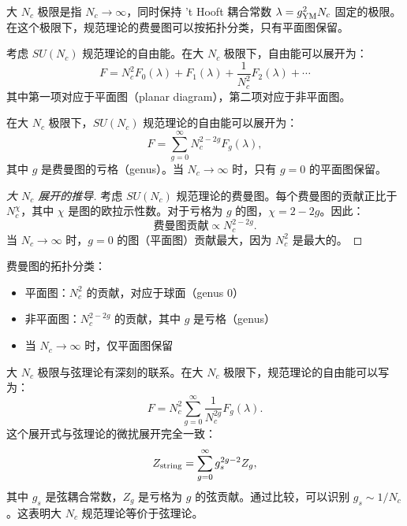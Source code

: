 \begin{definition}[大 $N_c$ 极限]
大 $N_c$ 极限是指 $N_c \to \infty$，同时保持 't Hooft 耦合常数 $\lambda = g_{\rm YM}^2 N_c$ 固定的极限。在这个极限下，规范理论的费曼图可以按拓扑分类，只有平面图保留。
\end{definition}

考虑 $SU(N_c)$ 规范理论的自由能。在大 $N_c$ 极限下，自由能可以展开为：
\begin{equation}
    F = N_c^2 F_0(\lambda) + F_1(\lambda) + \frac{1}{N_c^2} F_2(\lambda) + \cdots
\end{equation}
其中第一项对应于平面图（planar diagram），第二项对应于非平面图。

\begin{theorem}[大 $N_c$ 展开]
在大 $N_c$ 极限下，$SU(N_c)$ 规范理论的自由能可以展开为：
\begin{equation}
    F = \sum_{g=0}^{\infty} N_c^{2-2g} F_g(\lambda),
\end{equation}
其中 $g$ 是费曼图的亏格（genus）。当 $N_c \to \infty$ 时，只有 $g=0$ 的平面图保留。
\end{theorem}

\begin{proof}[大 $N_c$ 展开的推导]
考虑 $SU(N_c)$ 规范理论的费曼图。每个费曼图的贡献正比于 $N_c^{\chi}$，其中 $\chi$ 是图的欧拉示性数。对于亏格为 $g$ 的图，$\chi = 2 - 2g$。因此：
\begin{equation}
    \text{费曼图贡献} \propto N_c^{2-2g}.
\end{equation}
当 $N_c \to \infty$ 时，$g=0$ 的图（平面图）贡献最大，因为 $N_c^2$ 是最大的。
\end{proof}

费曼图的拓扑分类：
\begin{itemize}
    \item 平面图：$N_c^2$ 的贡献，对应于球面（genus 0）
    \item 非平面图：$N_c^{2-2g}$ 的贡献，其中 $g$ 是亏格（genus）
    \item 当 $N_c \to \infty$ 时，仅平面图保留
\end{itemize}

\begin{remark}[大 $N_c$ 极限与弦理论]
大 $N_c$ 极限与弦理论有深刻的联系。在大 $N_c$ 极限下，规范理论的自由能可以写为：
\begin{equation}
    F = N_c^2 \sum_{g=0}^{\infty} \frac{1}{N_c^{2g}} F_g(\lambda).
\end{equation}
这个展开式与弦理论的微扰展开完全一致：
\begin{equation}
    Z_{\rm string} = \sum_{g=0}^{\infty} g_s^{2g-2} Z_g,
\end{equation}
其中 $g_s$ 是弦耦合常数，$Z_g$ 是亏格为 $g$ 的弦贡献。通过比较，可以识别 $g_s \sim 1/N_c$。这表明大 $N_c$ 规范理论等价于弦理论。
\end{remark}

